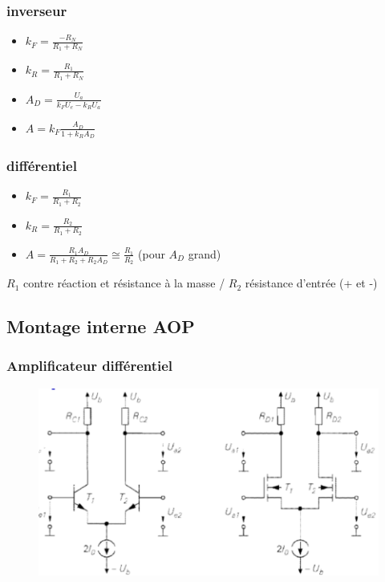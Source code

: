 \documentclass[resume]{subfiles}
\begin{document}
\begin{multicols}{3}
\subsubsection{inverseur}
\begin{itemize}
\item $k_F = \frac{-R_N}{R_1+R_N}$
\item $k_R = \frac{R_1}{R_1+R_N}$
\item $A_D = \frac{U_a}{k_FU_e-k_RU_a}$
\item $A = k_F\frac{A_D}{1+k_RA_D}$
\end{itemize}

\subsubsection{différentiel}
\begin{itemize}
\item $k_F = \frac{R_1}{R_1+R_2}$
\item $k_R = \frac{R_2}{R_1+R_2}$
\item $A = \frac{R_1A_D}{R_1+R_2+R_2A_D} \cong \frac{R_1}{R_2}$ (pour $A_D$ grand)
\end{itemize}
$R_1$ contre réaction et résistance à la masse / $R_2$ résistance d'entrée (+ et -)

\subsection{Montage interne AOP}
\subsubsection{Amplificateur différentiel}
\begin{figure}[H]
    \centering
    \includegraphics[width=0.8\columnwidth]{../images/OpAmp1/m_diff.png}
\end{figure}

\end{multicols}
\end{document}
